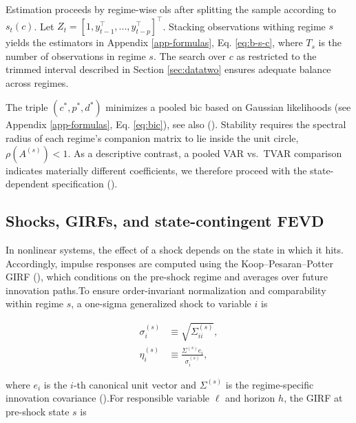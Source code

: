 \documentclass[
  11pt,
]{article}
\begin{document}
Estimation proceeds by regime-wise \ac{ols} after splitting the sample according to \(s_t(c)\). Let \(Z_t = [1,y_{t-1}^{\top},..., y_{t-p}^{\top}]^{\top}\). Stacking observations withing regime \(s\) yields the estimators in Appendix \ref{app-formulas}, Eq. \eqref{eq:b-s-c}, where \(T_s\) is the number of observations in regime \(s\). The search over \(c\) as restricted to the trimmed interval described in Section \ref{sec:datatwo} ensures adequate balance across regimes.

The triple \((c^*,p^*, d^* )\) minimizes a pooled \ac{bic} based on Gaussian likelihoods (see Appendix \ref{app-formulas}, Eq. \eqref{eq:bic}), see also (). Stability requires the spectral radius of each regime's companion matrix to lie inside the unit circle, \(ρ(A^{(s)})<1\). As a descriptive contrast, a pooled VAR vs.~TVAR comparison indicates materially different coefficients, we therefore proceed with the state-dependent specification ().

\subsection{Shocks, GIRFs, and state-contingent FEVD}\label{sec:econometrictwo}

In nonlinear systems, the effect of a shock depends on the state in which it hits. Accordingly, impulse responses are computed using the Koop--Pesaran--Potter GIRF (), which conditions on the pre-shock regime and averages over future innovation paths.To ensure order-invariant normalization and comparability within regime \(s\), a one-sigma generalized shock to variable \(i\) is

\begin{equation}\label{eq:n-i}
\begin{aligned}
\sigma_i^{(s)} &\equiv \sqrt{\Sigma_{ii}^{(s)}}, \\
\eta_i^{(s)}   &\equiv \frac{\Sigma^{(s)} e_i}{\sigma_i^{(s)}},
\end{aligned}
\end{equation}

where \(e_i\) is the \(i\)-th canonical unit vector and \(\Sigma^{(s)}\) is the regime-specific innovation covariance ().For responsible variable \(\ell\) and horizon \(h\), the GIRF at pre-shock state \(s\) is
\end{document}
